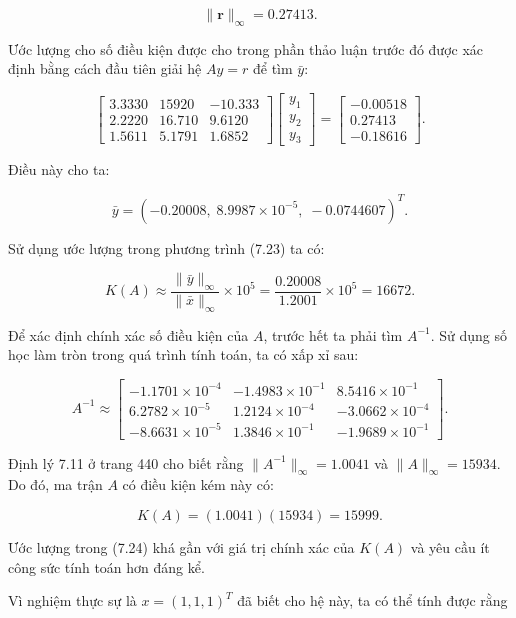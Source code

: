\[
\|\mathbf{r}\|_\infty = 0.27413.
\]

Ước lượng cho số điều kiện được cho trong phần thảo luận trước đó được xác định bằng cách đầu tiên giải hệ $A y = r$ để tìm $\bar{y}$:

\[
\begin{bmatrix}
3.3330 & 15920 & -10.333 \\[3pt]
2.2220 & 16.710 & 9.6120 \\[3pt]
1.5611 & 5.1791 & 1.6852
\end{bmatrix}
\begin{bmatrix}
y_1 \\[3pt] y_2 \\[3pt] y_3
\end{bmatrix}
=
\begin{bmatrix}
-0.00518 \\[3pt]
0.27413 \\[3pt]
-0.18616
\end{bmatrix}.
\]

Điều này cho ta:

\[
\bar{y} = (-0.20008,\; 8.9987 \times 10^{-5},\; -0.0744607)^{T}.
\]

Sử dụng ước lượng trong phương trình (7.23) ta có:

\[
K(A) \approx \frac{\|\bar{y}\|_\infty}{\|\bar{x}\|_\infty} \times 10^{5} = \frac{0.20008}{1.2001} \times 10^{5} = 16672. \tag{7.24}
\]

Để xác định chính xác số điều kiện của $A$, trước hết ta phải tìm $A^{-1}$.  
Sử dụng số học làm tròn trong quá trình tính toán, ta có xấp xỉ sau:

\[
A^{-1} \approx
\begin{bmatrix}
-1.1701 \times 10^{-4} & -1.4983 \times 10^{-1} & 8.5416 \times 10^{-1} \\[3pt]
6.2782 \times 10^{-5} & 1.2124 \times 10^{-4} & -3.0662 \times 10^{-4} \\[3pt]
-8.6631 \times 10^{-5} & 1.3846 \times 10^{-1} & -1.9689 \times 10^{-1}
\end{bmatrix}.
\]

Định lý 7.11 ở trang 440 cho biết rằng $\|A^{-1}\|_\infty = 1.0041$ và $\|A\|_\infty = 15934$.  
Do đó, ma trận $A$ có điều kiện kém này có:

\[
K(A) = (1.0041)(15934) = 15999.
\]

Ước lượng trong (7.24) khá gần với giá trị chính xác của $K(A)$ và yêu cầu ít công sức tính toán hơn đáng kể.

Vì nghiệm thực sự là $x = (1, 1, 1)^{T}$ đã biết cho hệ này, ta có thể tính được rằng

